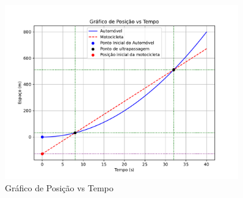 \documentclass[a4paper,12pt]{article}
\begin{document}
\begin{figure}[h!]
    \centering
    \includegraphics[width=0.9\textwidth]{images/grafico_posicao_tempo.pdf}  %
    \caption{Gráfico de Posição vs Tempo}
    \label{fig:grafico}
\end{figure}
\end{document}
